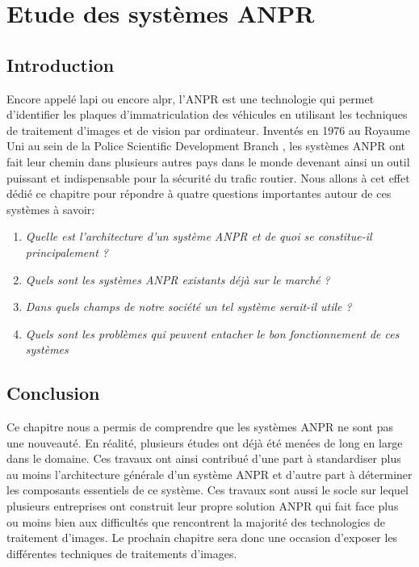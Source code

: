 \chapter{\textbf{Etude des systèmes ANPR}}
    \section{Introduction}
    Encore appelé \acrfull{lapi} ou encore \acrfull{alpr}, l’ANPR est une technologie qui permet d’identifier les plaques d’immatriculation des véhicules en utilisant les techniques de traitement d’images et de vision par ordinateur. Inventés en 1976 au Royaume Uni au sein de la Police Scientific Development Branch \cite{wikianpr}, les systèmes ANPR ont fait leur chemin dans plusieurs autres pays dans le monde devenant ainsi un outil puissant et indispensable pour la sécurité du trafic routier. Nous allons à cet effet dédié ce chapitre pour répondre à quatre questions importantes autour de ces systèmes à savoir:
        \begin{enumerate}
            \item \textit{Quelle est l’architecture d’un système ANPR et de quoi se constitue-il principalement ?}
            \item \textit{Quels sont les systèmes ANPR existants déjà sur le marché ?}
            \item \textit{Dans quels champs de notre société un tel système serait-il utile ?}
            \item \textit{Quels sont les problèmes qui peuvent entacher le bon fonctionnement de ces systèmes}
        \end{enumerate}

    
    
    
    


    \section{Conclusion}
    Ce chapitre nous a permis de comprendre que les systèmes ANPR ne sont pas une nouveauté. En réalité, plusieurs études ont déjà été menées de long en large dans le domaine. Ces travaux ont ainsi contribué d’une part à standardiser plus au moins l’architecture générale d’un système ANPR et d’autre part à déterminer les composants essentiels de ce système. Ces travaux sont aussi le socle sur lequel plusieurs entreprises ont construit leur propre solution ANPR qui fait face plus ou moins bien aux difficultés que rencontrent la majorité des technologies de traitement d’images. Le prochain chapitre sera donc une occasion d'exposer les différentes techniques de traitements d'images.